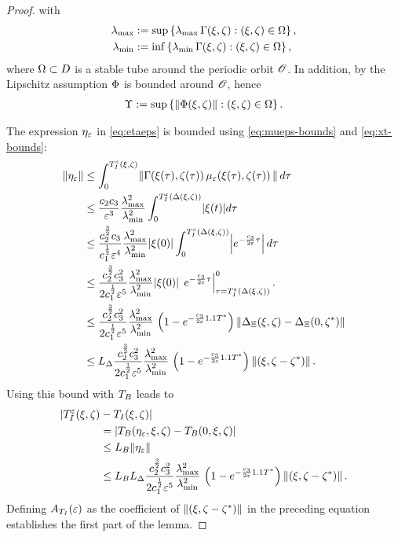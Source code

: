 \begin{proof}
  with
  \begin{align*}
    \lambda_{\mathrm{max}} &:= \sup \left\{\operatorname*{\lambda_{\mathrm{max}}}\Gamma(\xi, \zeta) : (\xi, \zeta) \in \Omega
    \right\},\\
    \lambda_{\mathrm{min}} &:= \inf \left\{\operatorname*{\lambda_{\mathrm{min}}}\Gamma(\xi, \zeta) : (\xi, \zeta) \in \Omega
    \right\},
  \end{align*}
  where $\Omega \subset D$ is a stable tube around the periodic orbit
  ${\mathscr O}$.
  In addition, by the Lipschitz assumption $\Phi$ is bounded around ${\mathscr O}$,
  hence
  \begin{align*}
    \Upsilon := \sup \left\{ \left\| \Phi(\xi, \zeta) \right\| : (\xi, \zeta) \in
      \Omega \right\}.
  \end{align*}

  The expression $\eta_{\varepsilon}$ in \eqref{eq:etaeps} is bounded using
  \eqref{eq:mueps-bounds} and \eqref{eq:xt-bounds}:
  \begin{align}
    \nonumber
    \|\eta_{\varepsilon}\| &\leq \int_{0}^{T_{I}^{\varepsilon}(\xi, \zeta)} \! \left\| \Gamma(\xi(\tau), \zeta(\tau)) \,
      \mu_{\varepsilon}(\xi(\tau), \zeta(\tau)) \, \right\| d\tau\\
    \nonumber
    &\leq \frac{c_{2}c_{3}}{\varepsilon^{3}}
    \frac{\lambda_{\mathrm{max}}^{2}}{\lambda_{\mathrm{min}}^{2}} \int_{0}^{T_{I}^{\varepsilon}(\Delta(\xi, \zeta))} \! |\xi(t)|
    d\tau\\
    \nonumber
    &\leq \frac{c_{2}^{\frac{3}{2}}c_{3}}{c_{1}^{\frac{1}{2}}\varepsilon^{4}}
    \frac{\lambda_{\mathrm{max}}^{2}}{\lambda_{\mathrm{min}}^{2}} |\xi(0)| \int_{0}^{T_{I}^{\varepsilon}(\Delta(\xi, \zeta))} \!
    \left|e^{-\frac{c_{3}}{2\varepsilon} \tau} \right| d\tau\\
    \nonumber
    &\leq \frac{c_{2}^{\frac{3}{2}}
      c_{3}^{2}}{2c_{1}^{\frac{1}{2}}\varepsilon^{5}}
    \frac{\lambda_{\mathrm{max}}^{2}}{\lambda_{\mathrm{min}}^{2}} |\xi(0)| \,
    \left. e^{-\frac{c_{3}}{2\varepsilon} \tau} \right|^{0}_{\tau=T_{I}^{\varepsilon}(\Delta(\xi, \zeta))}.\\
    \nonumber
    &\leq\frac{c_{2}^{\frac{3}{2}}
      c_{3}^{2}}{2c_{1}^{\frac{1}{2}}\varepsilon^{5}}
    \frac{\lambda_{\mathrm{max}}^{2}}{\lambda_{\mathrm{min}}^{2}}  \, \left(1 -
      e^{-\frac{c_{3}}{2\varepsilon} 1.1 T^{*}}\right) \left\|\Delta_{\Xi}(\xi, \zeta) -
      \Delta_{\Xi}(0, \zeta^{*})\right\|\\
    \label{eq:G-bound}
    &\leq L_{\Delta} \frac{c_{2}^{\frac{3}{2}}
      c_{3}^{2}}{2c_{1}^{\frac{1}{2}}\varepsilon^{5}}
    \frac{\lambda_{\mathrm{max}}^{2}}{\lambda_{\mathrm{min}}^{2}}  \, \left(1 -
      e^{-\frac{c_{3}}{2\varepsilon} 1.1 T^{*}}\right) \left\|(\xi, \zeta - \zeta^{*})\right\|.
  \end{align}
  Using this bound with $T_{B}$ leads to
  \begin{align*}
    | T_{I}^{\varepsilon}(\xi, \zeta) &- T_{I}(\xi, \zeta) |\\
    &= | T_{B}(\eta_{\varepsilon}, \xi, \zeta) - T_{B}(0, \xi, \zeta)|\\
    &\leq L_{B} \| \eta_{\varepsilon} \|\\
    &\leq L_{B} L_{\Delta} \frac{c_{2}^{\frac{3}{2}}
      c_{3}^{2}}{2c_{1}^{\frac{1}{2}}\varepsilon^{5}}
    \frac{\lambda_{\mathrm{max}}^{2}}{\lambda_{\mathrm{min}}^{2}}  \, \left(1 -
      e^{-\frac{c_{3}}{2\varepsilon} 1.1 T^{*}}\right) \left\|(\xi, \zeta - \zeta^{*})\right\|.
  \end{align*}
  Defining $A_{T_{I}}(\varepsilon)$ as the coefficient of $\left\|(\xi, \zeta - \zeta^{*})\right\|$ in the preceding equation
  establishes the first part of the lemma.


\end{proof}
